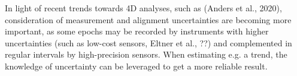 \documentclass[preprint,12pt,3p]{elsarticle}
\begin{document}
In light of recent trends towards 4D analyses, such as (Anders et al., 2020), consideration of measurement and alignment uncertainties are becoming more important, as some epochs may be recorded by instruments with higher uncertainties (such as low-cost sensors, Eltner et al., ??) and complemented in regular intervals by high-precision sensors. When estimating e.g. a trend, the knowledge of uncertainty can be leveraged to get a more reliable result.






% 









\end{document}
